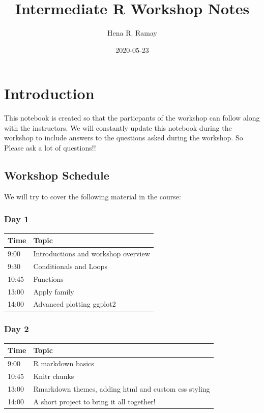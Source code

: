 \documentclass[
]{book}
\title{Intermediate R Workshop Notes}
\author{Hena R. Ramay}
\date{2020-05-23}
\begin{document}
\maketitle

{
\setcounter{tocdepth}{1}
\tableofcontents
}
\hypertarget{introduction}{%
\chapter{Introduction}\label{introduction}}

This notebook is created so that the particpants of the workshop can follow along with the instructors. We will constantly update this notebook during the workshop to include answers to the questions asked during the workshop. So Please ask a lot of questions!!

\hypertarget{workshop-schedule}{%
\section{Workshop Schedule}\label{workshop-schedule}}

We will try to cover the following material in the course:

\hypertarget{day-1}{%
\subsection*{Day 1}\label{day-1}}

\begin{longtable}[]{@{}ll@{}}
\toprule
Time & Topic\tabularnewline
\midrule
\endhead
9:00 & Introductions and workshop overview\tabularnewline
9:30 & Conditionals and Loops\tabularnewline
10:45 & Functions\tabularnewline
13:00 & Apply family\tabularnewline
14:00 & Advanced plotting ggplot2\tabularnewline
\bottomrule
\end{longtable}

\hypertarget{day-2}{%
\subsection*{Day 2}\label{day-2}}

\begin{longtable}[]{@{}ll@{}}
\toprule
Time & Topic\tabularnewline
\midrule
\endhead
9:00 & R markdown basics\tabularnewline
10:45 & Knitr chunks\tabularnewline
13:00 & Rmarkdown themes, adding html and custom css styling\tabularnewline
14:00 & A short project to bring it all together!\tabularnewline
\bottomrule
\end{longtable}
\end{document}

